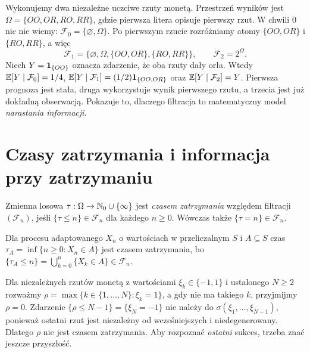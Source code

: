 \begin{przyklad}
Wykonujemy dwa niezależne uczciwe rzuty monetą.
Przestrzeń wyników jest
$\Omega=\{OO,OR,RO,RR\}$, gdzie pierwsza litera
opisuje pierwszy rzut. W chwili $0$ nic nie wiemy:
$\mathcal F_0=\{\varnothing,\Omega\}$. Po pierwszym
rzucie rozróżniamy atomy $\{OO,OR\}$ i $\{RO,RR\}$,
a więc
\[
\mathcal F_1=\{\varnothing,\Omega,
\{OO,OR\},\{RO,RR\}\},\qquad
\mathcal F_2=2^\Omega.
\]
Niech $Y=\mathbf{1}_{\{OO\}}$ oznacza zdarzenie,
że oba rzuty dały orła. Wtedy
$\mathbb{E}[Y\mid\mathcal F_0]=1/4$,
$\mathbb{E}[Y\mid\mathcal F_1]=(1/2)\mathbf{1}_{\{OO,OR\}}$
oraz $\mathbb{E}[Y\mid\mathcal F_2]=Y$.
Pierwsza prognoza jest stała, druga wykorzystuje wynik
pierwszego rzutu, a trzecia jest już dokładną
obserwacją. Pokazuje to, dlaczego filtracja
to matematyczny model \emph{narastania informacji}.
\end{przyklad}

\section{Czasy zatrzymania i informacja przy zatrzymaniu}

\begin{definicja}
Zmienna losowa $\tau:\Omega\to\mathbb{N}_0\cup\{\infty\}$
jest \emph{czasem zatrzymania} względem filtracji
$(\mathcal F_n)$, jeśli $\{\tau\leq n\}\in\mathcal F_n$
dla każdego $n\geq0$. Wówczas także
$\{\tau=n\}\in\mathcal F_n$.
\end{definicja}

\begin{przyklad}
Dla procesu adaptowanego $X_n$ o wartościach w
przeliczalnym $S$ i $A\subseteq S$ czas
$\tau_A=\inf\{n\geq0:X_n\in A\}$ jest czasem
zatrzymania, bo
$\{\tau_A\leq n\}=\bigcup_{k=0}^n\{X_k\in A\}
\in\mathcal F_n$.
\end{przyklad}

\begin{przyklad}
Dla niezależnych rzutów monetą z wartościami
$\xi_k\in\{-1,1\}$ i ustalonego $N\geq2$
rozważmy $\rho=\max\{k\in\{1,\ldots,N\}:\xi_k=1\}$,
a gdy nie ma takiego $k$, przyjmijmy $\rho=0$.
Zdarzenie $\{\rho\leq N-1\}=\{\xi_N=-1\}$
nie należy do $\sigma(\xi_1,\ldots,\xi_{N-1})$,
ponieważ ostatni rzut jest niezależny od wcześniejszych
i niedegenerowany. Dlatego $\rho$ nie jest czasem
zatrzymania. Aby rozpoznać \emph{ostatni} sukces,
trzeba znać jeszcze przyszłość.
\end{przyklad}

